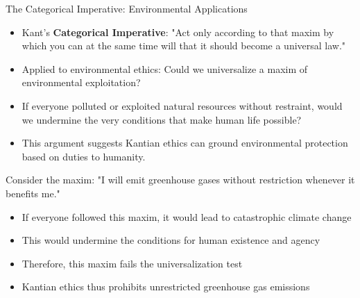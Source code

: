 \documentclass{beamer}
\begin{document}
	\begin{frame}{The Categorical Imperative: Environmental Applications}
		\begin{itemize}
			\item Kant's \textbf{Categorical Imperative}: "Act only according to that maxim by which you can at the same time will that it should become a universal law."
			\item Applied to environmental ethics: Could we universalize a maxim of environmental exploitation?
			\item If everyone polluted or exploited natural resources without restraint, would we undermine the very conditions that make human life possible?
			\item This argument suggests Kantian ethics can ground environmental protection based on duties to humanity.
		\end{itemize}
		
		\begin{example}
			\scriptsize
			Consider the maxim: "I will emit greenhouse gases without restriction whenever it benefits me."
			\begin{itemize}
				\item If everyone followed this maxim, it would lead to catastrophic climate change
				\item This would undermine the conditions for human existence and agency
				\item Therefore, this maxim fails the universalization test
				\item Kantian ethics thus prohibits unrestricted greenhouse gas emissions
			\end{itemize}
		\end{example}
	\end{frame}
	
\end{document}
